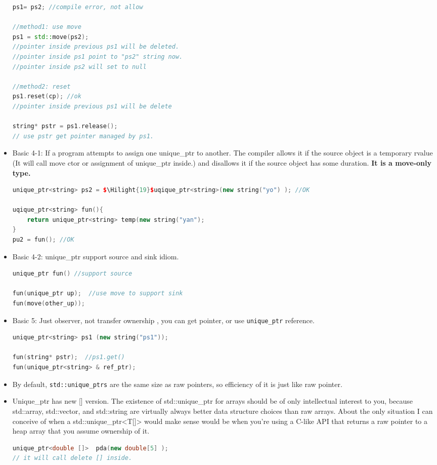 \documentclass[a4paper,11pt,twoside]{book}
\newcommand{\Hilight}[1]{\makebox[0pt][l]{\color{yellow}\rule[-3pt]{#1em}{11pt}}}
\newcommand{\Hilight}[1]{}
\begin{document}
\begin{itemize}
\begin{lstlisting}[frame=single, language=c++]
ps1= ps2; //compile error, not allow

//method1: use move
ps1 = std::move(ps2);
//pointer inside previous ps1 will be deleted.
//pointer inside ps1 point to "ps2" string now.
//pointer inside ps2 will set to null

//method2: reset
ps1.reset(cp); //ok
//pointer inside previous ps1 will be delete

string* pstr = ps1.release();
// use pstr get pointer managed by ps1.
\end{lstlisting}

\item Basic 4-1: If a program attempts to assign one unique\_ptr to another. The compiler allows it if the source object is a temporary rvalue (It will call move ctor or assignment of unique\_ptr inside.) and disallows it if the source object has some duration. \textbf{It is a move-only type.}
\begin{lstlisting}[frame=single, language=c++, mathescape=true]
unique_ptr<string> ps2 = $\Hilight{19}$uqique_ptr<string>(new string("yo") ); //OK

uqique_ptr<string> fun(){
	return unique_ptr<string> temp(new string("yan");
}
pu2 = fun(); //OK
\end{lstlisting}

\item Basic 4-2: unique\_ptr support source and sink idiom.
\begin{lstlisting}[frame=single, language=c++]
unique_ptr fun() //support source

fun(unique_ptr up);  //use move to support sink
fun(move(other_up));
\end{lstlisting}

\item Basic 5: Just observer, not transfer ownership , you can get pointer, or use \texttt{unique\_ptr} reference.
\begin{lstlisting}[frame=single, language=c++]
unique_ptr<string> ps1 (new string("ps1"));

fun(string* pstr);  //ps1.get()
fun(unique_ptr<string> & ref_ptr);
\end{lstlisting}

\item By default, \texttt{std::unique\_ptrs} are the same size as raw pointers, so efficiency of it is just like raw pointer.

\item Unique\_ptr has new [] version. The existence of std::unique\_ptr for arrays should be of only intellectual interest to you, because std::array, std::vector, and std::string are virtually always better data structure choices than raw arrays. About the only situation I can conceive of when a std::unique\_ptr<T[]> would make sense would be when you're using a C-like API that returns a raw pointer to a heap array that you assume ownership of it.
\begin{lstlisting}[frame=single, language=c++]
unique_ptr<double []>  pda(new double[5] );
// it will call delete [] inside.
\end{lstlisting}


\end{itemize}
\end{document}
